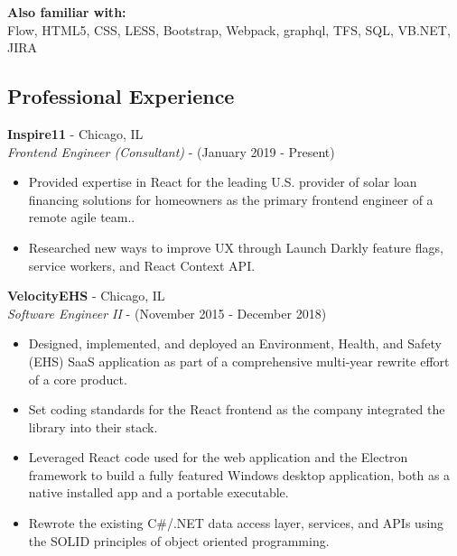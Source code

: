 \documentclass[12pt]{article}
\begin{document}
\begin{paracol}{2}
\noindent \textbf{Also familiar with:}\\
Flow, HTML5, CSS, LESS, Bootstrap, Webpack, graphql, TFS, SQL, VB.NET, JIRA

\switchcolumn 

\subsection*{Professional Experience} 

\textbf{Inspire11} - Chicago, IL \\
\textit{Frontend Engineer (Consultant)} - {\footnotesize{(January 2019 - Present)}} 
\begin{itemize}
    \setlength\itemsep{0.1em}
    \item{\footnotesize{Provided expertise in React for the leading U.S. provider of solar loan financing solutions for homeowners as the primary frontend engineer of a remote agile team..}}
    \item {\footnotesize{Researched new ways to improve UX through Launch Darkly feature flags, service workers, and React Context API.}}
\end{itemize} 

\noindent \textbf{VelocityEHS} - Chicago, IL \\
\textit{Software Engineer II} - {\footnotesize{(November 2015 - December 2018)}}
\begin{itemize}
    \setlength\itemsep{0.1em}
    \item {\footnotesize{Designed, implemented, and deployed an Environment, Health, and Safety (EHS) SaaS application as part of a comprehensive multi-year rewrite effort of a core product.}}
    \item {\footnotesize{Set coding standards for the React frontend as the company integrated the library into their stack.}}
    \item {\footnotesize{Leveraged React code used for the web application and the Electron framework to build a fully featured Windows desktop application, both as a native installed app and a portable executable.}}
    \item {\footnotesize{Rewrote the existing C\#/.NET data access layer, services, and APIs using the SOLID principles of object oriented programming.}}
\end{itemize} 


\end{paracol}
\end{document}
